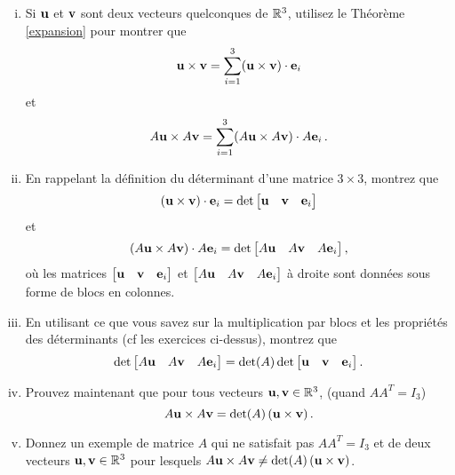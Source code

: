 \begin{prob}
\begin{enumerate}[a)]
\begin{enumerate}[i)]
\item Si $\mathbf{u}$ et $\mathbf{v}$ sont deux vecteurs quelconques de $\mathbb{R}^3$, utilisez le Théorème \ref{expansion} pour montrer que $$\mathbf{u} \times \mathbf{v}=  \displaystyle \sum_{i=1}^3 (\mathbf{u} \times \mathbf{v})\cdot \mathbf{e}_i$$ et $$A\mathbf{u} \times A\mathbf{v}= \displaystyle\sum_{i=1}^3 (A\mathbf{u} \times A\mathbf{v})\cdot A\mathbf{e}_i\,.$$
\medskip

\item En rappelant la définition du déterminant d'une matrice $3\times 3$, montrez que $$(\uu \times \vv)\cdot \ee_i=\det\bmatrix \uu&\vv&\ee_i\endbmatrix$$ et   $$(A\uu \times A\vv)\cdot A\ee_i=\det\bmatrix A\uu&A\vv&A\ee_i\endbmatrix,$$ o\`u les matrices $\bmatrix \uu&\vv&\ee_i\endbmatrix$ et $ \bmatrix A\uu&A\vv&A\ee_i\endbmatrix$ à droite sont données sous forme de blocs en colonnes.
\medskip

\item En utilisant ce que vous savez sur la multiplication par blocs et les propriétés des déterminants (cf les exercices ci-dessus), montrez que $$\det\bmatrix A\uu&A\vv&A\ee_i\endbmatrix=\det(A)\det \bmatrix  \uu& \vv& \ee_i\endbmatrix.$$
\medskip

\item Prouvez maintenant que pour tous vecteurs $\mathbf{u}, \mathbf{v} \in \mathbb{R}^3$, (quand $AA^T=I_3$) $$A\mathbf{u} \times A\mathbf{v} =\det(A) \, (\mathbf{u}\times \mathbf{v})\,.$$
\medskip

\item Donnez un exemple de matrice $A$ qui ne satisfait pas $AA^T=I_3$ et de deux vecteurs $\mathbf{u},\mathbf{v} \in \mathbb{R}^3$ pour lesquels $A\mathbf{u} \times A\mathbf{v} \not=\det(A) \, (\mathbf{u}\times \mathbf{v})$.
\medskip


\end{enumerate}

\end{enumerate}
\end{prob}

